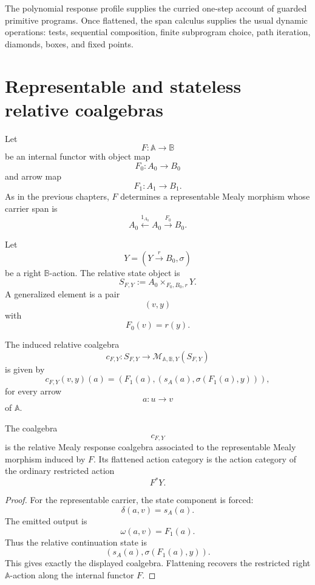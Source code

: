 \begin{remark}
\label{rem:poly-relative-program-algebra-from-polynomial}
The polynomial response profile supplies the curried one-step account of
guarded primitive programs.  Once flattened, the span calculus supplies the
usual dynamic operations: tests, sequential composition, finite subprogram
choice, path iteration, diamonds, boxes, and fixed points.
\end{remark}

\section{Representable and stateless relative coalgebras}
\label{sec:poly-relative-representable-stateless}

Let
\[
F:\mathbb A\to\mathbb B
\]
be an internal functor with object map
\[
F_0:A_0\to B_0
\]
and arrow map
\[
F_1:A_1\to B_1.
\]
As in the previous chapters, \(F\) determines a representable Mealy morphism
whose carrier span is
\[
A_0\xleftarrow{1_{A_0}}A_0\xrightarrow{F_0}B_0.
\]

Let
\[
Y=(Y\xrightarrow{r}B_0,\sigma)
\]
be a right \(\mathbb B\)-action.  The relative state object is
\[
S_{F,Y}:=A_0\times_{F_0,B_0,r}Y.
\]
A generalized element is a pair
\[
(v,y)
\]
with
\[
F_0(v)=r(y).
\]

The induced relative coalgebra
\[
c_{F,Y}:
S_{F,Y}\to
\mathcal M_{\mathbb A,\mathbb B,Y}(S_{F,Y})
\]
is given by
\[
c_{F,Y}(v,y)(a)
=
\left(
F_1(a),
\left(
s_A(a),
\sigma(F_1(a),y)
\right)
\right),
\]
for every arrow
\[
a:u\to v
\]
of \(\mathbb A\).

\begin{proposition}
\label{prop:poly-relative-stateless-response-coalgebra}
The coalgebra
\[
c_{F,Y}
\]
is the relative Mealy response coalgebra associated to the representable Mealy
morphism induced by \(F\).  Its flattened action category is the action
category of the ordinary restricted action
\[
F^\ast Y.
\]
\end{proposition}

\begin{proof}
For the representable carrier, the state component is forced:
\[
\delta(a,v)=s_A(a).
\]
The emitted output is
\[
\omega(a,v)=F_1(a).
\]
Thus the relative continuation state is
\[
(s_A(a),\sigma(F_1(a),y)).
\]
This gives exactly the displayed coalgebra.  Flattening recovers the restricted
right \(\mathbb A\)-action along the internal functor \(F\).
\end{proof}


